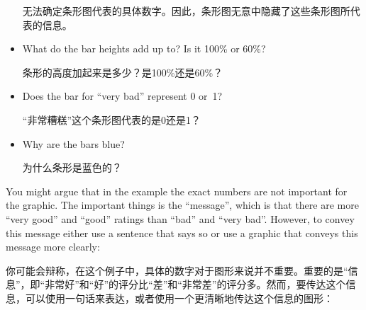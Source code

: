 \begin{itemize}
        无法确定条形图代表的具体数字。因此，条形图无意中隐藏了这些条形图所代表的信息。


    \item What do the bar heights add up to? Is it 100\% or 60\%?

    条形的高度加起来是多少？是100\%还是60\%？


    \item Does the bar for ``very bad'' represent 0 or~1?

    “非常糟糕”这个条形图代表的是0还是1？


    \item Why are the bars blue?

    为什么条形是蓝色的？


\end{itemize}

You might argue that in the example the exact numbers are not important for the
graphic. The important things is the ``message'', which is that there are more
``very good'' and ``good'' ratings than ``bad'' and ``very bad''. However, to
convey this message either use a sentence that says so or use a graphic that
conveys this message more clearly:

你可能会辩称，在这个例子中，具体的数字对于图形来说并不重要。重要的是“信息”，即“非常好”和“好”的评分比“差”和“非常差”的评分多。然而，要传达这个信息，可以使用一句话来表达，或者使用一个更清晰地传达这个信息的图形：

\medskip
\par
{}

